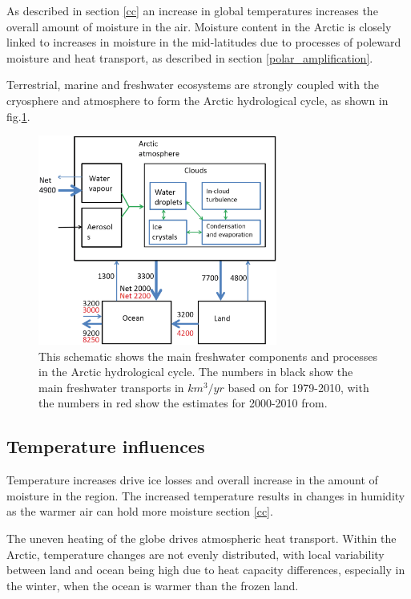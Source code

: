 \documentclass[12pt, oneside]{article}
\begin{document}
As described in section \ref{cc} an increase in global temperatures increases the overall amount of moisture in the air. Moisture content in the Arctic is closely linked to increases in moisture in the mid-latitudes due to processes of poleward moisture and heat transport, as described in section \ref{polar_amplification}.

Terrestrial, marine and freshwater ecosystems are strongly coupled with the cryosphere and atmosphere to form the Arctic hydrological cycle, as shown in fig.\ref{fig:hydro_cycle}.  


\begin{figure}[h!]
\centering
\includegraphics[width=0.7\textwidth]{hydological_cycle.png}
\caption{This schematic shows the main freshwater components and processes in the Arctic hydrological cycle\cite{vihma2016atmospheric}. The numbers in black show the main freshwater transports in $km^3/yr$ based on\cite{serreze2006large} for 1979-2010, with the numbers in red show the estimates for 2000-2010 from\cite{haine2015arctic}. }\label{fig:hydro_cycle}
\end{figure}

\subsection{Temperature influences}\label{temp}
Temperature increases drive ice losses and overall increase in the amount of moisture in the region. The increased temperature results in changes in humidity as the warmer air can hold more moisture section \ref{cc}.

The uneven heating of the globe drives atmospheric heat transport\cite{Goosse2018}. Within the Arctic, temperature changes are not evenly distributed, with local variability between land and ocean being high due to heat capacity differences\cite{dufour2016atmospheric}, especially in the winter, when the ocean is warmer than the frozen land. 
\end{document}

